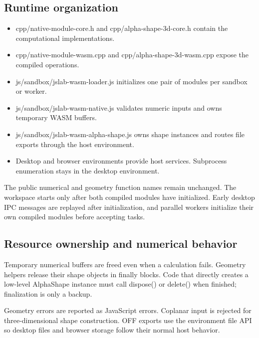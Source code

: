 \documentclass[12pt,a4paper]{article}
\begin{document}
\subsection{Runtime organization}

\begin{itemize}
\item cpp/native-module-core.h and cpp/alpha-shape-3d-core.h contain the computational implementations.

\item cpp/native-module-wasm.cpp and cpp/alpha-shape-3d-wasm.cpp expose the compiled operations.

\item js/sandbox/jslab-wasm-loader.js initializes one pair of modules per sandbox or worker.

\item js/sandbox/jslab-wasm-native.js validates numeric inputs and owns temporary WASM buffers.

\item js/sandbox/jslab-wasm-alpha-shape.js owns shape instances and routes file exports through the host environment.

\item Desktop and browser environments provide host services. Subprocess enumeration stays in the desktop environment.

\end{itemize}
The public numerical and geometry function names remain unchanged. The workspace starts only after both compiled modules have initialized. Early desktop IPC messages are replayed after initialization, and parallel workers initialize their own compiled modules before accepting tasks.


\subsection{Resource ownership and numerical behavior}

Temporary numerical buffers are freed even when a calculation fails. Geometry helpers release their shape objects in finally blocks. Code that directly creates a low-level AlphaShape instance must call dispose() or delete() when finished; finalization is only a backup.

Geometry errors are reported as JavaScript errors. Coplanar input is rejected for three-dimensional shape construction. OFF exports use the environment file API so desktop files and browser storage follow their normal host behavior.
\end{document}
